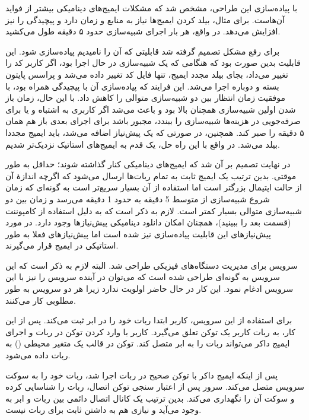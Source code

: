 \documentclass{cake-classes/short-report-fa}
\newcommand{\کیک}{مجموعهٔ کیکْ روباتیک}
\begin{document}
با پیاده‌سازی این طراحی، مشخص شد که مشکلات ایمیج‌های دینامیکی بیشتر از فواید آن‌هاست. برای مثال، بیلد کردن ایمیج‌ها نیاز به منابع و زمان دارد و پیچیدگی را نیز افزایش می‌دهد. در واقع، هر بار اجرای شبیه‌سازی حدود ۵ دقیقه طول می‌کشید.

برای رفع مشکل تصمیم گرفته شد قابلیتی که آن را  نامیدیم پیاده‌سازی شود. این قابلیت بدین صورت بود که هنگامی که یک شبیه‌سازی در حال اجرا بود، اگر کاربر کد را تغییر می‌داد، بجای بیلد مجدد ایمیج، تنها فایل کد تغییر داده می‌شد و پراسس پایتون بسته و دوباره اجرا می‌شد. این فرایند که پیاده‌سازی آن با پیچیدگی همراه بود، با موفقیت زمان انتظار بین دو شبیه‌سازی متوالی را کاهش داد. با این حال، زمان باز شدن اولین شبیه‌سازی همچنان بالا بود و باعث می‌شد اگر کاربری به اشتباه و یا برای صرفه‌جویی در هزینه‌ها شبیه‌سازی را ببندد، مجبور باشد برای اجرای بعدی باز هم همان ۵ دقیقه را صبر کند. همچنین، در صورتی که یک پیش‌نیاز اضافه می‌شد، باید ایمیج مجددا بیلد می‌شد. در واقع با این راه حل، یک قدم به ایمیج‌های استاتیک نزدیک‌تر شدیم.

در نهایت تصمیم بر آن شد که ایمیج‌های دینامیکی کنار گذاشته شوند؛ حداقل به طور موقتی. بدین ترتیب یک ایمیج ثابت به تمام ربات‌ها ارسال می‌شود که اگرچه اندازهٔ آن از حالت اپتیمال بزرگتر است اما استفاده از آن بسیار سریع‌تر است به گونه‌ای که زمان شروع شبیه‌سازی از متوسط 5 دقیقه به حدود 1 دقیقه می‌رسد و زمان بین دو شبیه‌سازی متوالی بسیار کمتر است. لازم به ذکر است که به دلیل استفاده از  کامپوننت  (قسمت بعد را ببینید)، همچنان امکان دانلود دینامیکی پیش‌نیازها وجود دارد. در مورد پیش‌نیازهای  این قابلیت پیاده‌سازی نیز شده است اما پیش‌نیازهای  فعلا به طور استاتیکی در ایمیج قرار می‌گیرند.

سرویس  برای مدیریت دستگاه‌های فیزیکی طراحی شد. البته لازم به ذکر است که این سرویس به گونه‌ای طراحی شده است که می‌توان در آینده سرویس  را نیز با این سرویس ادغام نمود. این کار در حال حاضر اولویت ندارد زیرا هر دو سرویس به طور مطلوبی کار می‌کنند.

برای استفاده از این سرویس، کاربر ابتدا ربات خود را در ابر ثبت می‌کند. پس از این کار، به ربات کاربر یک توکن تعلق می‌گیرد. کاربر با وارد کردن توکن در ربات و اجرای ایمیج داکر  می‌تواند ربات را به ابر متصل کند. توکن در قالب یک متغیر محیطی () به ربات داده می‌شود.

پس از اینکه ایمیج داکر با توکن صحیح در ربات اجرا شد، ربات خود را به سوکت سرویس  متصل می‌کند. سرور پس از اعتبار سنجی توکن اتصال، ربات را شناسایی کرده و سوکت آن را نگهداری می‌کند. بدین ترتیب یک کانال اتصال دائمی بین ربات و ابر به وجود می‌آید و نیازی هم به داشتن  ثابت برای ربات نیست.
\end{document}
